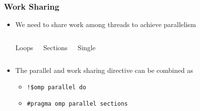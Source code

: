 \documentclass[10pt,t]{beamer}
\begin{document}
\begin{frame}
  \frametitle{Work Sharing}
  \begin{itemize}
    \item We need to share work among threads to achieve parallelism
  \begin{columns}
    \begin{block}{Loops}
    \end{block}
    \begin{block}{Sections}
    \end{block}
    \begin{block}{Single}
    \end{block}
  \end{columns}
    \item The parallel and work sharing directive can be combined as
    \begin{itemize}
      \item \texttt{!\$omp parallel do}
      \item \texttt{\#pragma omp parallel sections}
    \end{itemize}
  \end{itemize}
\end{frame}
\end{document}
